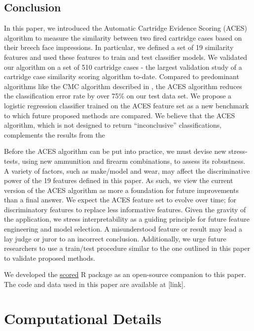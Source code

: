 \documentclass[11pt,]{isuthesis}
\begin{document}
\hypertarget{conclusion-1}{%
\section{Conclusion}\label{conclusion-1}}

In this paper, we introduced the Automatic Cartridge Evidence Scoring (ACES) algorithm to measure the similarity between two fired cartridge cases based on their breech face impressions.
In particular, we defined a set of 19 similarity features and used these features to train and test classifier models.
We validated our algorithm on a set of 510 cartridge cases - the largest validation study of a cartridge case similarity scoring algorithm to-date.
Compared to predominant algorithms like the CMC algorithm described in \citet{song_proposed_2013}, the ACES algorithm reduces the classification error rate by over 75\% on our test data set.
We propose a logistic regression classifier trained on the ACES feature set as a new benchmark to which future proposed methods are compared.
We believe that the ACES algorithm, which is not designed to return ``inconclusive'' classifications, complements the results from the

Before the ACES algorithm can be put into practice, we must devise new stress-tests, using new ammunition and firearm combinations, to assess its robustness.
A variety of factors, such as make/model and wear, may affect the discriminative power of the 19 features defined in this paper.
As such, we view the current version of the ACES algorithm as more a foundation for future improvements than a final answer.
We expect the ACES feature set to evolve over time; for discriminatory features to replace less informative features.
Given the gravity of the application, we stress interpretability as a guiding principle for future feature engineering and model selection.
A misunderstood feature or result may lead a lay judge or juror to an incorrect conclusion.
Additionally, we urge future researchers to use a train/test procedure similar to the one outlined in this paper to validate proposed methods.

We developed the \href{https://jzemmels.github.io/scored/}{scored} R package as an open-source companion to this paper.
The code and data used in this paper are available at {[}link{]}.

\newpage

\hypertarget{computational-details-1}{%
\chapter*{Computational Details}\label{computational-details-1}}
\end{document}
